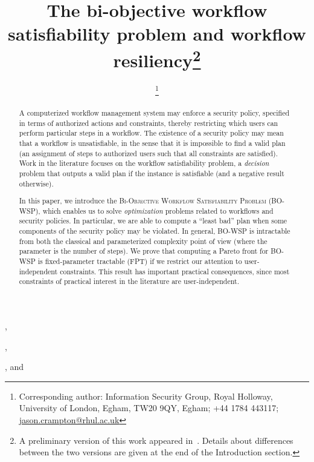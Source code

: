 \documentclass[jcs,crcready]{iosart1c}
\newcommand{\BOWSP}{\textsc{BO-WSP}\xspace}
\begin{document}
\begin{frontmatter}    

\title{The bi-objective workflow satisfiability problem and workflow resiliency\thanks{A preliminary version of this work appeared in~\cite{CrGuKa15}. Details about differences between the two versions are given at the end of the Introduction section.}
}
\runningtitle{\BOWSP and applications}


\maketitle


\author[A]{ \thanks{Corresponding author: Information Security Group, Royal Holloway, University of London, Egham, TW20 9QY, Egham; +44 1784 443117; \url{jason.crampton@rhul.ac.uk}}},
\author[A]{ },
\author[B]{ }, and
\author[A]{ }
\address[A]{Royal Holloway, University of London}
\address[B]{University of Essex and University of Nottingham}


\begin{abstract}
A computerized workflow management system may enforce a security policy, specified in terms of authorized actions and constraints, thereby restricting which users can perform particular steps in a workflow.
 The existence of a security policy may mean that a workflow is unsatisfiable, in the sense that it is impossible to find a valid plan (an assignment of steps to authorized users such that all constraints are satisfied).
 Work in the literature focuses on the workflow satisfiability problem, a \emph{decision} problem that outputs a valid plan if the instance is satisfiable (and a negative result otherwise).
 
 In this paper, we introduce the \textsc{Bi-Objective Workflow Satisfiability Problem} (\BOWSP), which enables us to solve \emph{optimization} problems related to workflows and security policies.
 In particular, we are able to compute a ``least bad'' plan when some components of the security policy may be violated.
In general, \BOWSP is intractable from both the classical and parameterized complexity point of view (where the parameter is the number of steps). 
We prove that computing a Pareto front for \BOWSP is fixed-parameter tractable (FPT) if we restrict our attention to user-independent constraints.
This result has important practical consequences, since most constraints of practical interest in the literature are user-independent.


\end{abstract}
\end{frontmatter}
\end{document}
